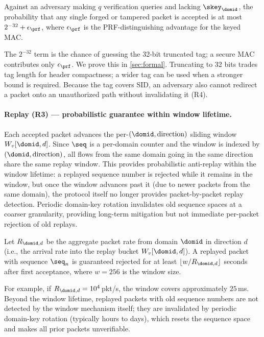 \begin{proposition}
\label{prop:forgery}
Against an adversary making $q$ verification queries and lacking $\skey_\domid$,
the probability that any single forged or tampered packet is accepted is at most
$2^{-32}+\epsilon_{\prf}$, where $\epsilon_{\prf}$ is the PRF-distinguishing
advantage for the keyed MAC.
\end{proposition}

The $2^{-32}$ term is the chance of guessing the 32-bit truncated tag; a secure
MAC contributes only $\epsilon_{\prf}$. We prove this in \cref{sec:formal}.
Truncating to 32 bits trades tag length for header
compactness; a wider tag can be used when a stronger bound is required. Because the tag covers \textsf{SID}, an adversary also cannot
redirect a packet onto an unauthorized path without invalidating it (R4).

\paragraph{Replay (R3) --- probabilistic guarantee within window lifetime.}
Each accepted packet advances the per-$(\domid, \text{direction})$ sliding window $W_v[\domid, d]$. Since $\seq$ is a per-domain counter and the window is indexed by $(\domid, \text{direction})$, all flows from the same domain going in the same direction share the same replay window. This provides probabilistic anti-replay within the window lifetime: a replayed sequence number is rejected while it remains in the window, but once the window advances past it (due to newer packets from the same domain), the protocol itself no longer provides packet-by-packet replay detection. Periodic domain-key rotation invalidates old sequence spaces at a coarser granularity, providing long-term mitigation but not immediate per-packet rejection of old replays.

\begin{proposition}
\label{prop:replay}
Let $R_{\domid,d}$ be the aggregate packet rate from domain $\domid$ in direction $d$ (i.e., the arrival rate into the replay bucket $W_v[\domid, d]$). A replayed packet with sequence $\seq_n$ is guaranteed rejected for at least
$\lfloor w / R_{\domid,d} \rfloor$ seconds after first acceptance, where $w=256$ is the window size.
\end{proposition}

For example, if $R_{\domid,d}=10^4$\,pkt/s, the window covers approximately $25$\,ms. Beyond the window lifetime, replayed packets with old sequence numbers are not detected by the window mechanism itself; they are invalidated by periodic domain-key rotation (typically hours to days), which resets the sequence space and makes all prior packets unverifiable.

